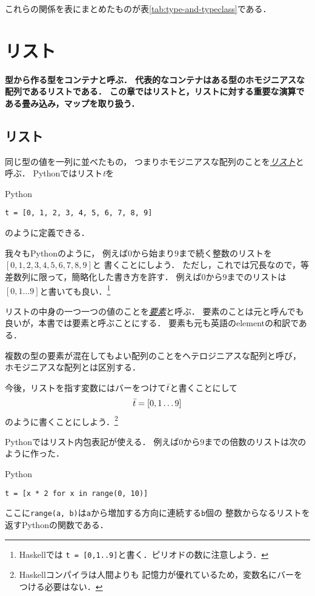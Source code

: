 \documentclass[a5paper,draft]{jsbook}
\newcommand{\programminglanguage}[1]{\textsf{#1}}
\newcommand{\haskell}{\programminglanguage{Haskell}}
\newcommand{\python}{\programminglanguage{Python}}
\newenvironment{leader}{\begingroup\bf}{\endgroup}
\newcommand{\keyword}[1]{{\underline{\emph{#1}}}}
\newcommand{\code}[1]{\texttt{#1}}
\newenvironment{pythoncode}{\begin{itembox}[r]{\python}}{\end{itembox}}
\newcommand{\pthnId}[1]{\textit{#1}}
\newcommand{\pthnKeyword}[1]{\textbf{#1}}
\newcommand{\pthnOp}[1]{\texttt{#1}}
\newcommand{\mathListVar}[1]{\Bar{#1}}
\begin{document}
これらの関係を表にまとめたものが表\ref{tab:type-and-typeclass}である．

\chapter{リスト}
\begin{leader}
型から作る型をコンテナと呼ぶ．
代表的なコンテナはある型のホモジニアスな配列であるリストである．
この章ではリストと，リストに対する重要な演算である畳み込み，マップを取り扱う．
\end{leader}


\section{リスト}

同じ型の値を一列に並べたもの，
つまりホモジニアスな配列のことを\keyword{リスト}と呼ぶ．
\python ではリスト\pthnId{t}を
\begin{pythoncode}
\begin{verbatim}
t = [0, 1, 2, 3, 4, 5, 6, 7, 8, 9]
\end{verbatim}
\end{pythoncode}
のように定義できる．

我々も\python のように，
例えば$0$から始まり$9$まで続く整数のリストを$[0,1,2,3,4,5,6,7,8,9]$と
書くことにしよう．
ただし，これでは冗長なので，等差数列に限って，簡略化した書き方を許す．
例えば$0$から$9$までのリストは$[0,1\dots9]$と書いても良い．\footnote{\haskell では
\code{t = [0,1..9]}と書く．ピリオドの数に注意しよう．}

リストの中身の一つ一つの値のことを\keyword{要素}と呼ぶ．
要素のことは元と呼んでも良いが，本書では要素と呼ぶことにする．
要素も元も英語のelementの和訳である．

複数の型の要素が混在してもよい配列のことをヘテロジニアスな配列と呼び，
ホモジニアスな配列とは区別する．

今後，リストを指す変数にはバーをつけて$\mathListVar{t}$と書くことにして
\begin{equation}
\mathListVar{t}=[0,1\dots9]
\end{equation}
のように書くことにしよう．\footnote{\haskell コンパイラは人間よりも
記憶力が優れているため，変数名にバーをつける必要はない．}

\python ではリスト内包表記が使える．
例えば$0$から$9$までの倍数のリストは次のように作った．
\begin{pythoncode}
\begin{verbatim}
t = [x * 2 for x in range(0, 10)]
\end{verbatim}
\end{pythoncode}
ここに\code{range(a, b)}は\code{a}から増加する方向に連続する\code{b}個の
整数からなるリストを返す\python の関数である．
\end{document}
